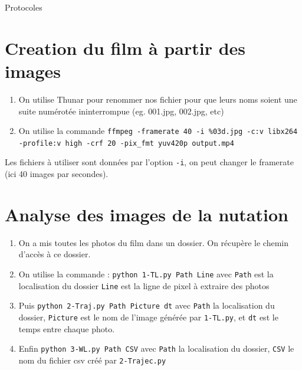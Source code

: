 \documentclass[10pt,a4paper]{article}
\begin{document}
\newpage
\begin{center}
        {\Huge Protocoles}
\end{center}
\appendix

\section{Creation du film à partir des images\label{film}}
\begin{enumerate}
        \item On utilise Thunar pour renommer nos fichier pour que leurs noms soient une suite numérotée ininterrompue (eg. 001.jpg, 002.jpg, etc)
        \item On utilise la commande \texttt{ffmpeg -framerate 40 -i \%03d.jpg -c:v libx264 -profile:v high -crf 20 -pix\_fmt yuv420p output.mp4}
\end{enumerate}
Les fichiers à utiliser sont données par l'option \texttt{-i}, on peut changer le framerate (ici 40 images par secondes).

\section{Analyse des images de la nutation\label{anaNut}}
\begin{enumerate}
    \item On a mis toutes les photos du film dans un dossier. On récupère le chemin d'accès à ce dossier.
    \item On utilise la commande : \texttt{python 1-TL.py Path Line} avec \texttt{Path} est la localisation du dossier \texttt{Line} est la ligne de pixel à extraire des photos
    \item Puis \texttt{python 2-Traj.py Path Picture dt} avec \texttt{Path} la localisation du dossier, \texttt{Picture} est le nom de l'image générée par \texttt{1-TL.py}, et \texttt{dt} est le temps entre chaque photo.
    \item Enfin \texttt{python 3-WL.py Path CSV} avec \texttt{Path} la localisation du dossier, \texttt{CSV} le nom du fichier csv créé par \texttt{2-Trajec.py}
\end{enumerate}
\end{document}
